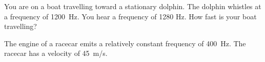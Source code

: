 \documentclass[10pt]{exam}
\begin{document}
\begin{questions}
\pagebreak
  
\question
  You are on a boat travelling toward a stationary dolphin.  The dolphin whistles at a frequency of 1200~Hz.  You hear a frequency of 1280 Hz.  How fast is your boat travelling?
  \vs[3] 


\question 
  The engine of a racecar emits a relatively constant frequency of 400~Hz.  The racecar has a velocity of 45~m/s.




\end{questions}
\end{document}
